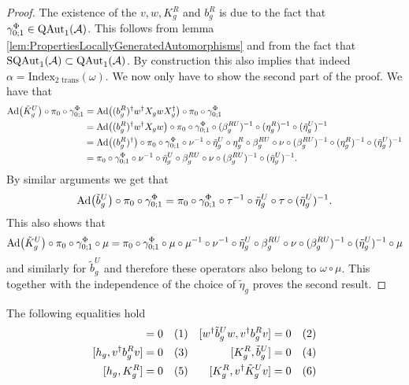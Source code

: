 \documentclass[11pt,a4paper,twoside]{article}
\numberwithin{equation}{section}
\begin{document}
\begin{proof}
	The existence of the $v,w,K_g^R$ and $b_g^R$ is due to the fact that $\gamma^\Phi_{0;1}\in \QAut{\AA}$. This follows from lemma \ref{lem:PropertiesLocallyGeneratedAutomorphisms} and from the fact that $\textrm{SQAut}_1(\AA)\subset \QAut{\AA}$. By construction this also implies that indeed $\alpha=\textrm{Index}_{\text{2 trans}}(\omega)$. We now only have to show the second part of the proof. We have that
	\begin{align}
		\Ad{\tilde{K}_g^U}\circ\pi_0\circ\gamma^\Phi_{0;1}&=\Ad{(b_g^R)^\dagger w^\dagger X_g w X_g^\dagger}\circ\pi_0\circ\gamma^\Phi_{0;1}\\
		&=\Ad{(b_g^R)^\dagger w^\dagger X_g w}\circ\pi_0\circ\gamma^\Phi_{0;1}\circ(\beta_g^{RU})^{-1}\circ(\eta_g^R)^{-1}\circ(\tilde{\eta}_g^U)^{-1}\\
		&=\Ad{(b_g^R)^\dagger}\circ\pi_0\circ\gamma^\Phi_{0;1}\circ\nu^{-1}\circ\tilde{\eta}_g^U\circ\eta_g^R\circ\beta_g^{RU}\circ\nu\circ(\beta_g^{RU})^{-1}\circ(\eta_g^R)^{-1}\circ(\tilde{\eta}_g^U)^{-1}\\
		&=\pi_0\circ\gamma^\Phi_{0;1}\circ\nu^{-1}\circ\tilde{\eta}_g^U\circ\beta_g^{RU}\circ\nu\circ(\beta_g^{RU})^{-1}\circ(\tilde{\eta}_g^U)^{-1}.
	\end{align}
	By similar arguments we get that
	\begin{equation}
		\Ad{\tilde{b}_g^U}\circ\pi_0\circ\gamma^\Phi_{0;1}=\pi_0\circ\gamma^\Phi_{0;1}\circ\tau^{-1}\circ\tilde{\eta}_g^U\circ\tau\circ(\tilde{\eta}_g^U)^{-1}.
	\end{equation}
	This also shows that
	\begin{equation}
		\Ad{\tilde{K}_g^U}\circ\pi_0\circ\gamma^\Phi_{0;1}\circ\mu=\pi_0\circ\gamma^\Phi_{0;1}\circ\mu\circ\mu^{-1}\circ\nu^{-1}\circ\tilde{\eta}_g^U\circ\beta_g^{RU}\circ\nu\circ(\beta_g^{RU})^{-1}\circ(\tilde{\eta}_g^U)^{-1}\circ\mu
	\end{equation}
	and similarly for $\tilde{b}_g^U$ and therefore these operators also belong to $\omega\circ\mu$. This together with the independence of the choice of $\tilde{\eta}_g$ proves the second result.
\end{proof}
\begin{lemma}
	The following equalities hold
	\begin{align*}
		[h_g ,w^\dagger \tilde{b}_g^U w]&=0 \Label{eq:H^1IndexRotationInvariantCommutator1}& [w^\dagger \tilde{b}_g^U w,v^\dagger b_g^R v]&=0 \Label{eq:H^1IndexRotationInvariantCommutator4}\\
		[h_g, v^\dagger b_g^R v]&=0 \Label{eq:H^1IndexRotationInvariantCommutator2}& [K_g^R,\tilde{b}_g^U] &= 0 \Label{eq:H^1IndexRotationInvariantCommutator5}\\
		[h_g ,K_g^R]&=0 \Label{eq:H^1IndexRotationInvariantCommutator3}& [K_g^R,v^\dagger \tilde{K}^U_g v] &= 0 \Label{eq:H^1IndexRotationInvariantCommutator6}
	\end{align*}
\end{lemma}
\end{document}
